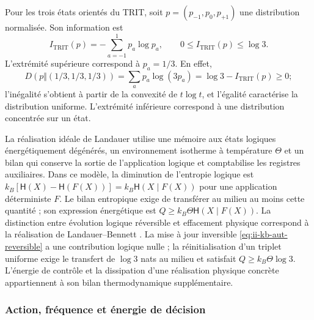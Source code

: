 Pour les trois états orientés du TRIT, soit
\(p=(p_{-1},p_0,p_{+1})\) une distribution normalisée. Son information est
\begin{equation}
 I_{\mathrm{TRIT}}(p)=-\sum_{a=-1}^{1}p_a\log p_a,
 \qquad 0\leq I_{\mathrm{TRIT}}(p)\leq\log3.
 \label{eq:ii-kb-aut-trit}
\end{equation}
L'extrémité supérieure correspond à \(p_a=1/3\). En effet,
\[
 D(p\Vert(1/3,1/3,1/3))
 =\sum_ap_a\log(3p_a)=\log3-I_{\mathrm{TRIT}}(p)\geq0;
\]
l'inégalité s'obtient à partir de la convexité de \(t\log t\), et l'égalité caractérise la distribution uniforme. L'extrémité inférieure correspond à une distribution concentrée sur un état.

La réalisation idéale de Landauer utilise une mémoire aux états logiques
énergétiquement dégénérés, un environnement isotherme à température \(\Theta\)
et un bilan qui conserve la sortie de l'application logique et comptabilise les
registres auxiliaires. Dans ce modèle, la diminution de l'entropie logique est
\(k_B[\mathsf H(X)-\mathsf H(F(X))]
=k_B\mathsf H(X\mid F(X))\) pour une application déterministe \(F\).
Le bilan entropique exige de transférer au milieu au moins cette quantité ;
son expression énergétique est \(Q\geq k_B\Theta\mathsf H(X\mid F(X))\).
La distinction entre évolution logique réversible et effacement physique
correspond à la réalisation de Landauer--Bennett \cite{bennett2003}.
La mise à jour inversible
\eqref{eq:ii-kb-aut-reversible} a une contribution logique nulle ; la
réinitialisation d'un triplet uniforme exige le transfert de \(\log3\) nats
au milieu et satisfait \(Q\geq k_B\Theta\log3\).
L'énergie de contrôle et la dissipation d'une réalisation physique
concrète appartiennent à son bilan thermodynamique supplémentaire.

\subsubsection{Action, fréquence et énergie de décision}

